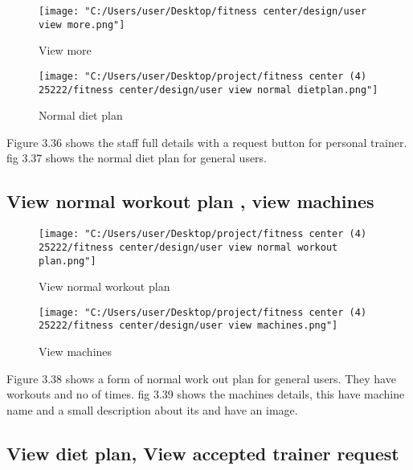 \documentclass[a4paper,12pt,toc=flat]{report}
\begin{document}
{{	\begin{figure}[!ht]
		\begin{minipage}{0.45\linewidth}
			\texttt{[image: "C:/Users/user/Desktop/fitness center/design/user view more.png"]}
			\caption{View more}
		\end{minipage}
		\hfill
		\begin{minipage}{0.45\linewidth}
			\texttt{[image: "C:/Users/user/Desktop/project/fitness center (4) 25222/fitness center/design/user view normal dietplan.png"]}
			\caption{ Normal diet plan}
		\end{minipage}
	\end{figure}
	 \hspace*{12pt}Figure 3.36 shows the staff full details with a request button for personal trainer. fig 3.37 shows the normal diet plan for general users.
	\pagebreak
	\subsection{ View normal workout plan , view machines}
	
	\begin{figure}[!ht]
		\begin{minipage}{0.45\linewidth}
			\texttt{[image: "C:/Users/user/Desktop/project/fitness center (4) 25222/fitness center/design/user view normal workout plan.png"]}
			\caption{View normal workout plan}
		\end{minipage}
		\hfill
		\begin{minipage}{0.45\linewidth}
			\texttt{[image: "C:/Users/user/Desktop/project/fitness center (4) 25222/fitness center/design/user view machines.png"]}
			\caption{ View machines}
		\end{minipage}
	\end{figure}
	
	
	 \hspace*{12pt}Figure 3.38 shows a form of normal work out plan for general users. They have workouts and no of times. fig 3.39 shows the machines details, this have machine name and a small description about its and have an image.
	\pagebreak
	\subsection{View diet plan, View accepted trainer request}
	
}}
\end{document}
